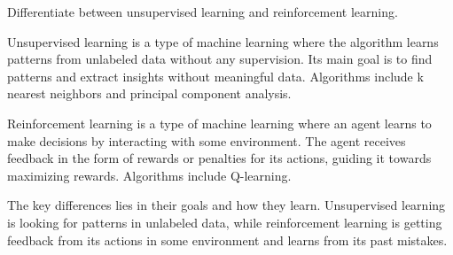 Differentiate between unsupervised learning and reinforcement learning.

\begin{tcolorbox}
Unsupervised learning is a type of machine learning where the algorithm learns patterns from unlabeled data without any supervision. Its main goal is to find patterns and extract insights without meaningful data. Algorithms include k nearest neighbors and principal component analysis.

\vspace{2mm}

Reinforcement learning is a type of machine learning where an agent learns to make decisions by interacting with some environment. The agent receives feedback in the form of rewards or penalties for its actions, guiding it towards maximizing rewards. Algorithms include Q-learning.

\vspace{2mm}

The key differences lies in their goals and how they learn. Unsupervised learning is looking for patterns in unlabeled data, while reinforcement learning is getting feedback from its actions in some environment and learns from its past mistakes. 
\end{tcolorbox}
